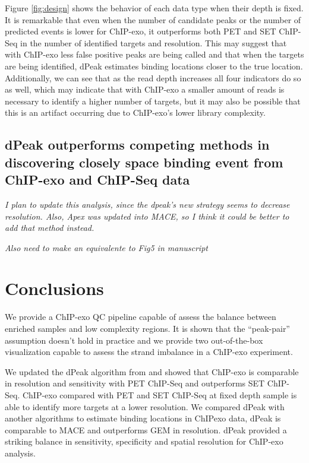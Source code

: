 \documentclass{bmcart}\usepackage[]{graphicx}\usepackage[]{color}
\begin{document}
Figure \ref{fig:design} shows the behavior of each data type when
their depth is fixed. It is remarkable that even when the number of
candidate peaks or the number of predicted events is lower for
ChIP-exo, it outperforms both PET and SET ChIP-Seq in the number of
identified targets and resolution. This may suggest that with ChIP-exo
less false positive peaks are being called and that when the targets
are being identified, dPeak estimates binding locations closer to the
true location. Additionally, we can see that as the read depth
increases all four indicators do so as well, which may indicate that
with ChIP-exo a smaller amount of reads is necessary to identify a
higher number of targets, but it may also be possible that this is an
artifact occurring due to ChIP-exo's lower library complexity.

\subsection{dPeak outperforms competing methods in discovering closely
  space binding event from ChIP-exo and ChIP-Seq data}
\label{sec:dpeak_comp}

\emph{I plan to update this analysis, since the dpeak's new strategy
  seems to decrease resolution. Also, Apex was updated into MACE, so I
  think it could be better to add that method instead.}

\emph{Also need to make an equivalente to Fig5 in manuscript}

\section{Conclusions}
\label{sec:conclusions}

We provide a ChIP-exo QC pipeline capable of assess the balance between
enriched samples and low complexity regions. It is shown that the
``peak-pair'' assumption doesn't hold in practice and we provide two
out-of-the-box visualization capable to assess the strand imbalance in
a ChIP-exo experiment.

We updated the dPeak algorithm from \cite{dpeak} and showed that
ChIP-exo is comparable in resolution and sensitivity with PET ChIP-Seq
and outperforms SET ChIP-Seq. ChIP-exo compared with PET and SET
ChIP-Seq at fixed depth sample is able to identify more targets at a
lower resolution. We compared dPeak with another algorithms to
estimate binding locations in ChIPexo data, dPeak is comparable to
MACE and outperforms GEM in resolution. dPeak provided a striking
balance in sensitivity, specificity and spatial resolution for
ChIP-exo analysis.
\end{document}
